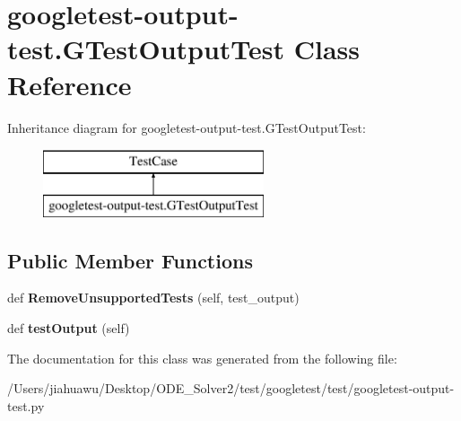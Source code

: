 \hypertarget{classgoogletest-output-test_1_1_g_test_output_test}{}\section{googletest-\/output-\/test.G\+Test\+Output\+Test Class Reference}
\label{classgoogletest-output-test_1_1_g_test_output_test}
Inheritance diagram for googletest-\/output-\/test.G\+Test\+Output\+Test\+:\begin{figure}[H]
\begin{center}
\leavevmode
\includegraphics[height=2.000000cm]{classgoogletest-output-test_1_1_g_test_output_test}
\end{center}
\end{figure}
\subsection*{Public Member Functions}
\begin{DoxyCompactItemize}
\item 
\mbox{\label{classgoogletest-output-test_1_1_g_test_output_test_af058c7917b05d06b0e6249061db264a3}} 
def {\bfseries Remove\+Unsupported\+Tests} (self, test\+\_\+output)
\item 
\mbox{\label{classgoogletest-output-test_1_1_g_test_output_test_a4ab77925377e6c837d33f07960a31212}} 
def {\bfseries test\+Output} (self)
\end{DoxyCompactItemize}


The documentation for this class was generated from the following file\+:\begin{DoxyCompactItemize}
\item 
/\+Users/jiahuawu/\+Desktop/\+O\+D\+E\+\_\+\+Solver2/test/googletest/test/googletest-\/output-\/test.\+py\end{DoxyCompactItemize}
